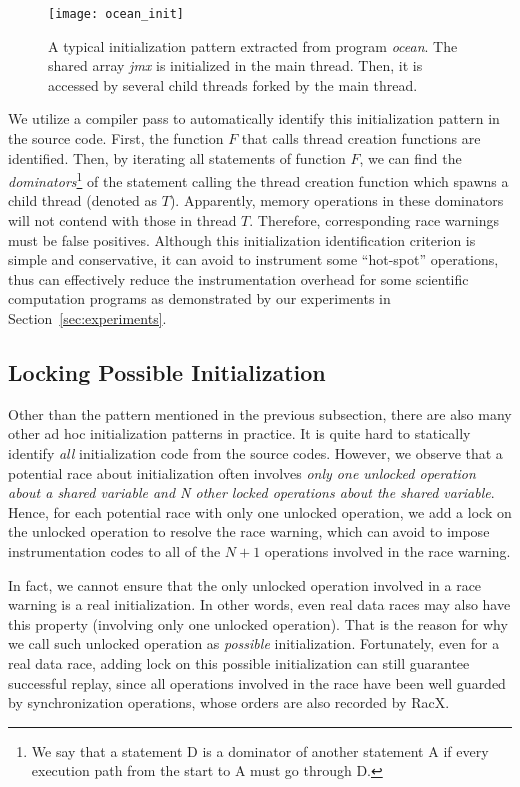 \documentclass[10pt,onecolumn,letterpaper]{article}
\begin{document}
\begin{figure} [htbg]
\centering
\texttt{[image: ocean\_init]}
\caption{A typical initialization pattern extracted from program
\emph{ocean}. The shared array \emph{jmx} is initialized in the main
thread. Then, it is accessed by several child threads forked by the
main thread.}\label{fig:oinit}
\end{figure}

We utilize a compiler pass to automatically identify this
initialization pattern in the source code. First, the function $F$
that calls thread creation functions are identified. Then, by
iterating all statements of function $F$, we can find the
\emph{dominators}\footnote{We say that a statement D is a dominator
of another statement A if every execution path from the start to A
must go through D.} of the statement calling the thread creation
function which spawns a child thread (denoted as $T$). Apparently,
memory operations in these dominators will not contend with those in
thread $T$. Therefore, corresponding race warnings must be false
positives. Although this initialization identification criterion is
simple and conservative, it can avoid to instrument some
``hot-spot'' operations, thus can effectively reduce the
instrumentation overhead for some scientific computation programs as
demonstrated by our experiments in Section~\ref{sec:experiments}.

\subsection{Locking Possible Initialization}
Other than the pattern mentioned in the previous subsection, there
are also many other ad hoc initialization patterns in practice. It
is quite hard to statically identify \emph{all} initialization code
from the source codes. However, we observe that a potential race
about initialization often involves \emph{only one unlocked
operation about a shared variable and N other locked operations
about the shared variable}. Hence, for each potential race with only
one unlocked operation, we add a lock on the unlocked operation to
resolve the race warning, which can avoid to impose instrumentation
codes to all of the $N+1$ operations involved in the race warning.

In fact, we cannot ensure that the only unlocked operation involved
in a race warning is a real initialization. In other words, even
real data races may also have this property (involving only one
unlocked operation). That is the reason for why we call such
unlocked operation as \emph{possible} initialization. Fortunately,
even for a real data race, adding lock on this possible
initialization can still guarantee successful replay, since all
operations involved in the race have been well guarded by
synchronization operations, whose orders are also recorded by RacX.
\end{document}
